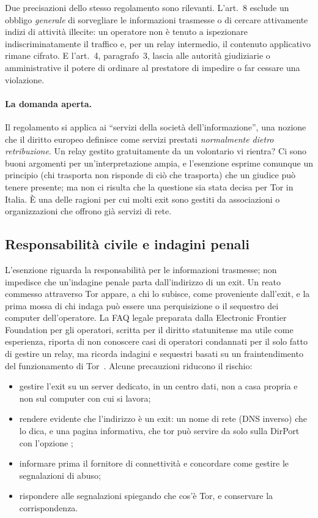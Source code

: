 Due precisazioni dello stesso regolamento sono rilevanti. L'art.~8 esclude un obbligo \emph{generale} di sorvegliare le informazioni trasmesse o di cercare attivamente indizi di attività illecite: un operatore non è tenuto a ispezionare indiscriminatamente il traffico e, per un relay intermedio, il contenuto applicativo rimane cifrato. E l'art.~4, paragrafo~3, lascia alle autorità giudiziarie o amministrative il potere di ordinare al prestatore di impedire o far cessare una violazione.

\paragraph{La domanda aperta.} Il regolamento si applica ai \enquote{servizi della società dell'informazione}, una nozione che il diritto europeo definisce come servizi prestati \emph{normalmente dietro retribuzione}. Un relay gestito gratuitamente da un volontario vi rientra? Ci sono buoni argomenti per un'interpretazione ampia, e l'esenzione esprime comunque un principio (chi trasporta non risponde di ciò che trasporta) che un giudice può tenere presente; ma non ci risulta che la questione sia stata decisa per Tor in Italia. È una delle ragioni per cui molti exit sono gestiti da associazioni o organizzazioni che offrono già servizi di rete.

\subsection{Responsabilità civile e indagini penali}

L'esenzione riguarda la responsabilità per le informazioni trasmesse; non impedisce che un'indagine penale parta dall'indirizzo di un exit. Un reato commesso attraverso Tor appare, a chi lo subisce, come proveniente dall'exit, e la prima mossa di chi indaga può essere una perquisizione o il sequestro dei computer dell'operatore. La FAQ legale preparata dalla Electronic Frontier Foundation per gli operatori, scritta per il diritto statunitense ma utile come esperienza, riporta di non conoscere casi di operatori condannati per il solo fatto di gestire un relay, ma ricorda indagini e sequestri basati su un fraintendimento del funzionamento di Tor~\cite{efflegalfaq}. Alcune precauzioni riducono il rischio:
\begin{itemize}
  \item gestire l'exit su un server dedicato, in un centro dati, non a casa propria e non sul computer con cui si lavora;
  \item rendere evidente che l'indirizzo è un exit: un nome di rete (DNS inverso) che lo dica, e una pagina informativa, che tor può servire da solo sulla DirPort con l'opzione ;
  \item informare prima il fornitore di connettività e concordare come gestire le segnalazioni di abuso;
  \item rispondere alle segnalazioni spiegando che cos'è Tor, e conservare la corrispondenza.
\end{itemize}

